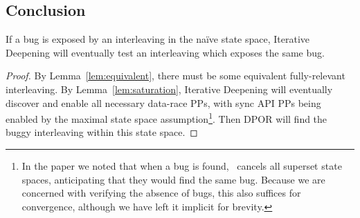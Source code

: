 
\subsection{Conclusion}

\setcounter{theorem}{1}
\begin{theorem}
	If a bug is exposed by an interleaving in the na\"{i}ve state space, Iterative Deepening will eventually test an interleaving which exposes the same bug.
\end{theorem}

\begin{proof}
By Lemma~\ref{lem:equivalent}, there must be some equivalent fully-relevant interleaving.
By Lemma~\ref{lem:saturation}, Iterative Deepening will eventually discover and enable all necessary data-race PPs, with sync API PPs being enabled by the maximal state space assumption\footnote{
		In the paper we noted that when a bug is found, \quicksand~cancels all superset state spaces, anticipating that they would find the same bug.
		Because we are concerned with verifying the absence of bugs, this also suffices for convergence, although we have left it implicit for brevity.}.
Then DPOR will find the buggy interleaving within this state space.
\end{proof}
